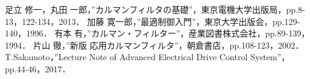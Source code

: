 \documentclass[a4paper,12pt]{jarticle}
\begin{document}
\newpage
\begin{thebibliography}{99}
 足立 修一，丸田 一郎，”カルマンフィルタの基礎”，東京電機大学出版局，pp.8-13，122-134，2013．
 加藤 寛一郎，”最適制御入門”，東京大学出版会，pp.129-140，1996．
 有本 有，”カルマン・フィルター”，産業図書株式会社，pp.89-139，1994．
 片山 徹，”新版 応用カルマンフィルタ”，朝倉書店，pp.108-123，2002．
 T.Sakamoto，”Lecture Note of Advanced Electrical Drive Control System”，pp.44-46，2017．
\end{thebibliography}
\end{document}
